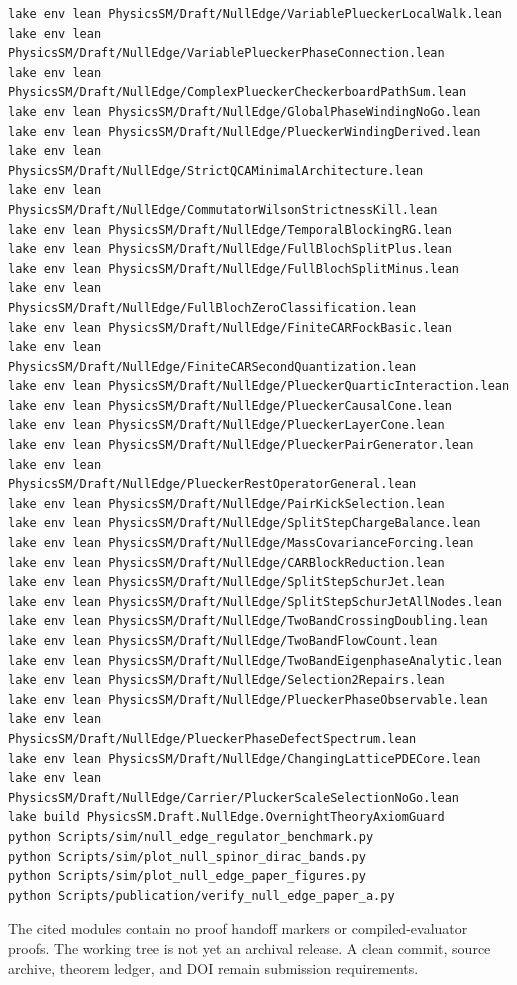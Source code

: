 \documentclass[11pt]{article}
\begin{document}
\begin{verbatim}
lake env lean PhysicsSM/Draft/NullEdge/VariablePlueckerLocalWalk.lean
lake env lean PhysicsSM/Draft/NullEdge/VariablePlueckerPhaseConnection.lean
lake env lean PhysicsSM/Draft/NullEdge/ComplexPlueckerCheckerboardPathSum.lean
lake env lean PhysicsSM/Draft/NullEdge/GlobalPhaseWindingNoGo.lean
lake env lean PhysicsSM/Draft/NullEdge/PlueckerWindingDerived.lean
lake env lean PhysicsSM/Draft/NullEdge/StrictQCAMinimalArchitecture.lean
lake env lean PhysicsSM/Draft/NullEdge/CommutatorWilsonStrictnessKill.lean
lake env lean PhysicsSM/Draft/NullEdge/TemporalBlockingRG.lean
lake env lean PhysicsSM/Draft/NullEdge/FullBlochSplitPlus.lean
lake env lean PhysicsSM/Draft/NullEdge/FullBlochSplitMinus.lean
lake env lean PhysicsSM/Draft/NullEdge/FullBlochZeroClassification.lean
lake env lean PhysicsSM/Draft/NullEdge/FiniteCARFockBasic.lean
lake env lean PhysicsSM/Draft/NullEdge/FiniteCARSecondQuantization.lean
lake env lean PhysicsSM/Draft/NullEdge/PlueckerQuarticInteraction.lean
lake env lean PhysicsSM/Draft/NullEdge/PlueckerCausalCone.lean
lake env lean PhysicsSM/Draft/NullEdge/PlueckerLayerCone.lean
lake env lean PhysicsSM/Draft/NullEdge/PlueckerPairGenerator.lean
lake env lean PhysicsSM/Draft/NullEdge/PlueckerRestOperatorGeneral.lean
lake env lean PhysicsSM/Draft/NullEdge/PairKickSelection.lean
lake env lean PhysicsSM/Draft/NullEdge/SplitStepChargeBalance.lean
lake env lean PhysicsSM/Draft/NullEdge/MassCovarianceForcing.lean
lake env lean PhysicsSM/Draft/NullEdge/CARBlockReduction.lean
lake env lean PhysicsSM/Draft/NullEdge/SplitStepSchurJet.lean
lake env lean PhysicsSM/Draft/NullEdge/SplitStepSchurJetAllNodes.lean
lake env lean PhysicsSM/Draft/NullEdge/TwoBandCrossingDoubling.lean
lake env lean PhysicsSM/Draft/NullEdge/TwoBandFlowCount.lean
lake env lean PhysicsSM/Draft/NullEdge/TwoBandEigenphaseAnalytic.lean
lake env lean PhysicsSM/Draft/NullEdge/Selection2Repairs.lean
lake env lean PhysicsSM/Draft/NullEdge/PlueckerPhaseObservable.lean
lake env lean PhysicsSM/Draft/NullEdge/PlueckerPhaseDefectSpectrum.lean
lake env lean PhysicsSM/Draft/NullEdge/ChangingLatticePDECore.lean
lake env lean PhysicsSM/Draft/NullEdge/Carrier/PluckerScaleSelectionNoGo.lean
lake build PhysicsSM.Draft.NullEdge.OvernightTheoryAxiomGuard
python Scripts/sim/null_edge_regulator_benchmark.py
python Scripts/sim/plot_null_spinor_dirac_bands.py
python Scripts/sim/plot_null_edge_paper_figures.py
python Scripts/publication/verify_null_edge_paper_a.py
\end{verbatim}
The cited modules contain no proof handoff markers or compiled-evaluator proofs.
The working tree is not yet an archival release.  A clean commit, source
archive, theorem ledger, and DOI remain submission requirements.
\fi
\end{document}

